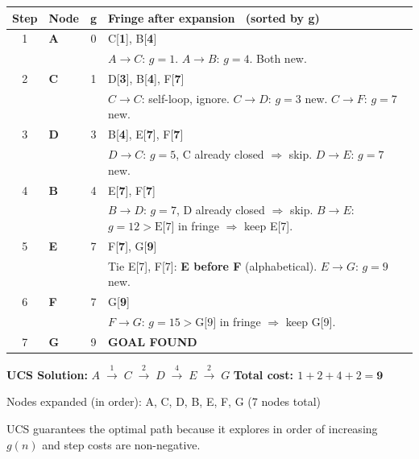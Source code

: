 \documentclass[12pt, a4paper]{article}
\newenvironment{answerbox}{\begin{mdframed}[style=answerframe]}{\end{mdframed}}
\newcommand{\goal}{\textcolor{green!55!black}{\textbf{GOAL FOUND}}}
\begin{document}
\vspace{0.4em}
\begin{center}
\renewcommand{\arraystretch}{1.3}
\small
\begin{tabular}{c|l|c|p{9cm}}
\toprule
\textbf{Step} & \textbf{Node} & \textbf{g} &
\textbf{Fringe after expansion \ (sorted by g)} \\
\midrule
1 & \textbf{A} & 0
  & C[\textbf{1}],\; B[\textbf{4}] \\
  & & & \footnotesize $A{\to}C$: $g{=}1$. $A{\to}B$: $g{=}4$. Both new. \\
\midrule
2 & \textbf{C} & 1
  & D[\textbf{3}],\; B[\textbf{4}],\; F[\textbf{7}] \\
  & & & \footnotesize $C{\to}C$: self-loop, ignore. $C{\to}D$: $g{=}3$ new. $C{\to}F$: $g{=}7$ new. \\
\midrule
3 & \textbf{D} & 3
  & B[\textbf{4}],\; E[\textbf{7}],\; F[\textbf{7}] \\
  & & & \footnotesize $D{\to}C$: $g{=}5$, C already closed $\Rightarrow$ skip. $D{\to}E$: $g{=}7$ new. \\
\midrule
4 & \textbf{B} & 4
  & E[\textbf{7}],\; F[\textbf{7}] \\
  & & & \footnotesize $B{\to}D$: $g{=}7$, D already closed $\Rightarrow$ skip. $B{\to}E$: $g{=}12 > \text{E[7]}$ in fringe $\Rightarrow$ keep E[7]. \\
\midrule
5 & \textbf{E} & 7
  & F[\textbf{7}],\; G[\textbf{9}] \\
  & & & \footnotesize Tie E[7], F[7]: \textbf{E before F} (alphabetical). $E{\to}G$: $g{=}9$ new. \\
\midrule
6 & \textbf{F} & 7
  & G[\textbf{9}] \\
  & & & \footnotesize $F{\to}G$: $g{=}15 > \text{G[9]}$ in fringe $\Rightarrow$ keep G[9]. \\
\midrule
7 & \textbf{G} & 9
  & \goal \\
\bottomrule
\end{tabular}
\end{center}

\begin{answerbox}
\textbf{UCS Solution:} $A \;\xrightarrow{1}\; C \;\xrightarrow{2}\; D \;\xrightarrow{4}\; E \;\xrightarrow{2}\; G$
\hfill \textbf{Total cost: $1+2+4+2 = \mathbf{9}$}

Nodes expanded (in order): A, C, D, B, E, F, G \quad(7 nodes total)

UCS guarantees the optimal path because it explores in order of increasing $g(n)$ and step costs are non-negative.
\end{answerbox}
\end{document}
